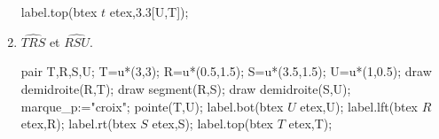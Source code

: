 \begin{exercice*}
\begin{multicols}{2}
\begin{enumerate}
\begin{Geometrie}[CoinHD={(4u,3.5u)}]
                label.top(btex $t$ etex,3.3[U,T]);            
            \end{Geometrie}
            \item $\widehat{TRS}$ et $\widehat{RSU}$.\par
            \hspace*{-5mm}
            \begin{Geometrie}[CoinHD={(4u,3.5u)}]
                pair T,R,S,U;
                T=u*(3,3);
                R=u*(0.5,1.5);
                S=u*(3.5,1.5);
                U=u*(1,0.5);
                draw demidroite(R,T);
                draw segment(R,S);
                draw demidroite(S,U);
                marque_p:="croix";
                pointe(T,U);
                label.bot(btex $U$ etex,U);
                label.lft(btex $R$ etex,R);            
                label.rt(btex $S$ etex,S);
                label.top(btex $T$ etex,T);
            \end{Geometrie}
        \end{enumerate}
    \end{multicols}
\end{exercice*}
